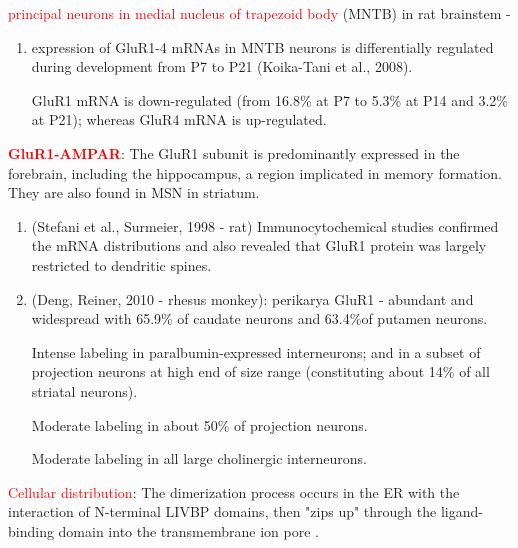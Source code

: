 \textcolor{red}{principal neurons in medial nucleus of trapezoid body} (MNTB)
in rat brainstem -
\begin{enumerate}
  \item  expression of GluR1-4 mRNAs in MNTB neurons is differentially regulated
  during development from P7 to P21 (Koika-Tani et al., 2008).
  
  GluR1 mRNA is down-regulated (from 16.8\% at P7 to 5.3\% at P14 and 3.2\% at
  P21); whereas GluR4 mRNA is up-regulated.

\end{enumerate}

\textcolor{red}{\bf GluR1-AMPAR}:
The GluR1 subunit is predominantly expressed in the forebrain, including the
hippocampus, a region implicated in memory formation. They are also found in MSN
in striatum.
\begin{enumerate}

  \item  (Stefani et al., Surmeier, 1998 - rat) Immunocytochemical studies
  confirmed the mRNA distributions and also revealed that GluR1 protein was largely
  restricted to dendritic spines.
  
  \item (Deng, Reiner, 2010 - rhesus monkey): 
  perikarya GluR1 - abundant and widespread with 65.9\% of caudate neurons and
  63.4\%of putamen neurons.
  
  Intense labeling  in paralbumin-expressed interneurons; and in a subset of
  projection neurons at high end of size range (constituting about 14\% of all
  striatal neurons). 
  
  Moderate labeling in about 50\% of projection neurons.
  
  Moderate labeling in all large cholinergic interneurons.
  
\end{enumerate}

\textcolor{red}{Cellular distribution}:
The dimerization process occurs in the ER with the interaction of  N-terminal
LIVBP domains, then "zips up" through the ligand-binding domain into the
transmembrane ion pore \citep{greger2007}. 

